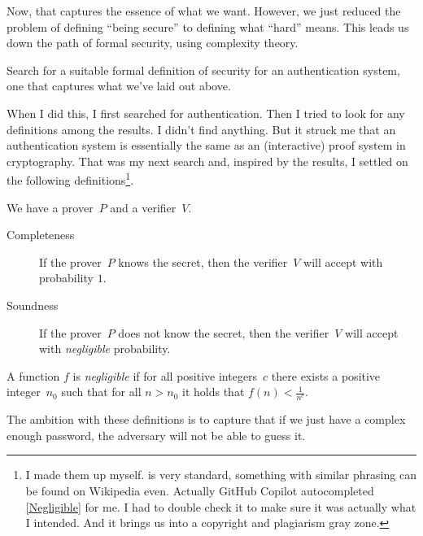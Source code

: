 Now, that captures the essence of what we want.
However, we just reduced the problem of defining \enquote{being secure} to 
defining what \enquote{hard} means.
This leads us down the path of formal security, \eg using complexity theory.

\begin{exercise}
  Search for a suitable formal definition of security for an authentication 
  system, one that captures what we've laid out above.
\end{exercise}

When I did this, I first searched for authentication.
Then I tried to look for any definitions among the results.
I didn't find anything.
But it struck me that an authentication system is essentially the same as an 
(interactive) proof system in cryptography.
That was my next search and, inspired by the results, I settled on the 
following definitions\footnote{%
   I made them up myself.
   is very standard, something with similar phrasing can be 
  found on Wikipedia even.
  Actually GitHub Copilot autocompleted \cref{Negligible} for me.
  I had to double check it to make sure it was actually what I intended.
  And it brings us into a copyright and plagiarism gray zone.
}.

\begin{frame}
\begin{definition}\label{FormalSecurity}
  We have a prover~\(P\) and a verifier~\(V\).
  \begin{description}
    \item[Completeness] If the prover~\(P\) knows the secret, then the 
      verifier~\(V\) will accept with probability \(1\).
    \item[Soundness] If the prover~\(P\) does not know the secret, then the 
      verifier~\(V\) will accept with \emph{negligible} probability.
  \end{description}
\end{definition}

\begin{definition}[Negligible]\label{Negligible}
  A function \(f\) is \emph{negligible} if for all positive integers~\(c\) 
  there exists a positive integer~\(n_0\) such that for all \(n > n_0\) it 
  holds that \(f(n) < \frac{1}{n^c}\).
\end{definition}
\end{frame}

The ambition with these definitions is to capture that if we just have a 
complex enough password, the adversary will not be able to guess it.


